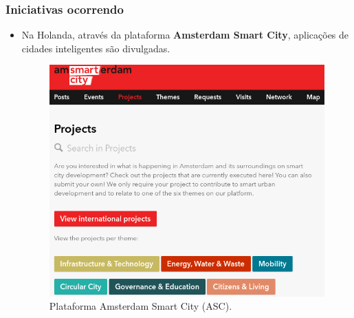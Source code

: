 \begin{frame}
    \frametitle{Iniciativas ocorrendo}
    \begin{itemize}
        \item Na Holanda, através da plataforma \textbf{Amsterdam Smart City},
            aplicações de cidades inteligentes são divulgadas.

        \begin{figure}
            \includegraphics[scale=0.25]{figures/asc.png}
            \caption{Plataforma Amsterdam Smart City (ASC).}
        \end{figure}
    \end{itemize}
\end{frame}
